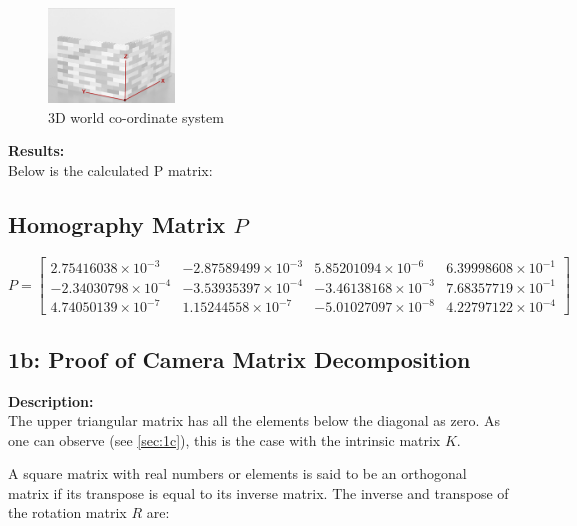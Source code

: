\documentclass{article}
\begin{document}
    \begin{figure}[H] %
      \centering
      \includegraphics[width=0.3\textwidth]{axis.png} %
      \caption{3D world co-ordinate system}
      \label{fig:lego1}
  \end{figure}

\textbf{Results:} \\
Below is the calculated P matrix: 

\subsection*{Homography Matrix \( P \)}
\[
P =
\begin{bmatrix}
2.75416038 \times 10^{-3} & -2.87589499 \times 10^{-3} & 5.85201094 \times 10^{-6} & 6.39998608 \times 10^{-1} \\
-2.34030798 \times 10^{-4} & -3.53935397 \times 10^{-4} & -3.46138168 \times 10^{-3} & 7.68357719 \times 10^{-1} \\
4.74050139 \times 10^{-7} & 1.15244558 \times 10^{-7} & -5.01027097 \times 10^{-8} & 4.22797122 \times 10^{-4}
\end{bmatrix}
\]

\subsection{1b: Proof of Camera Matrix Decomposition}
\textbf{Description:} \\
The upper triangular matrix has all the elements below the diagonal as zero. As one can observe (see \ref{sec:1c}), this is the case with the intrinsic matrix \(K\). 
\newline

A square matrix with real numbers or elements is said to be an orthogonal matrix if its transpose is equal to its inverse matrix. 
The inverse and transpose of the rotation matrix \( R \) are: 
\end{document}
